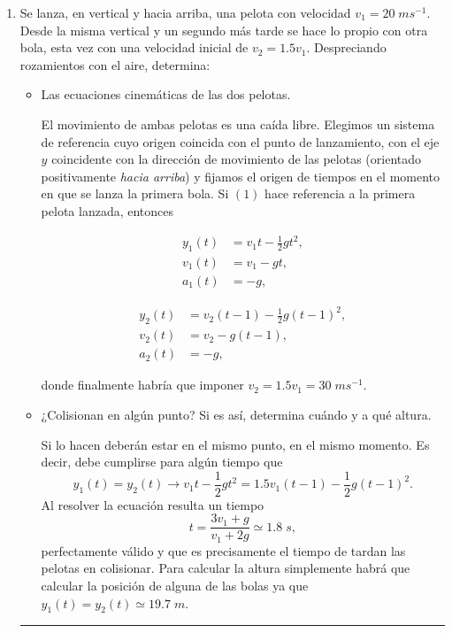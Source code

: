 \documentclass[a4paper,14pt]{extarticle}
\title{\textbf{	}}
\date{}
\newcommand{\halmos}{
\vspace*{-4ex}

\begin{flushright}
\rule{1mm}{2.5mm} \end{flushright}
\vspace*{-3.5ex}

}
\renewcommand{\qed}{\halmos}
\begin{document}



\begin{enumerate}
  \setlength\itemsep{1.5em}
    
    
    \item Se lanza, en vertical y hacia arriba, una pelota con velocidad $v_1=20\;ms^{-1}$. Desde la misma vertical y un segundo más tarde se hace lo propio con otra bola, esta vez con una velocidad inicial de $v_2=1.5v_1$. Despreciando rozamientos con el aire, determina:
    	\begin{itemize}
    		\item[a)] Las ecuaciones cinemáticas de las dos pelotas.
    		\begin{mdframed}[backgroundcolor=yellow!20]  
    		El movimiento de ambas pelotas es una caída libre. Elegimos un sistema de referencia cuyo origen coincida con el punto de lanzamiento, con el eje $y$ coincidente con la dirección de movimiento de las pelotas (orientado positivamente \textit{hacia arriba}) y fijamos el origen de tiempos en el momento en que se lanza la primera bola. Si $(1)$ hace referencia a la primera pelota lanzada, entonces
    		\begin{minipage}{.5\textwidth}
    			\begin{align*}
    				y_1(t)&=v_1t-\frac{1}{2}gt^2,\\
    				v_1(t)&=v_1-gt,\\
    				a_1(t)&=-g,
    			\end{align*}
    		\end{minipage}\hfill
    		\begin{minipage}{.5\textwidth}
    			\begin{align*}
    				y_2(t)&=v_2(t-1)-\frac{1}{2}g(t-1)^2,\\
    				v_2(t)&=v_2-g(t-1),\\
    				a_2(t)&=-g,
    			\end{align*}
    		\end{minipage}
    		\vspace{1ex}
    		
    		donde finalmente habría que imponer $v_2=1.5v_1=30\;ms^{-1}$.
    		\end{mdframed}
    		\item[b)] ¿Colisionan en algún punto? Si es así, determina cuándo y a qué altura.
    		\begin{mdframed}[backgroundcolor=yellow!20]  
    		Si lo hacen deberán estar en el mismo punto, en el mismo momento. Es decir, debe cumplirse para algún tiempo que
    		\[y_1(t)=y_2(t)\longrightarrow v_1t-\frac{1}{2}gt^2=1.5v_1(t-1)-\frac{1}{2}g(t-1)^2.\]
    		Al resolver la ecuación resulta un tiempo 
    		\[t=\frac{3v_1+g}{v_1+2g}\simeq 1.8\;s,\]
    		perfectamente válido y que es precisamente el tiempo de tardan las pelotas en colisionar. Para calcular la altura simplemente habrá que calcular la posición de alguna de las bolas ya que $y_1(t)=y_2(t)\simeq 19.7\;m$.    		
    		\end{mdframed}
    	\end{itemize}
    \qed 
    

\end{enumerate}
\end{document}
